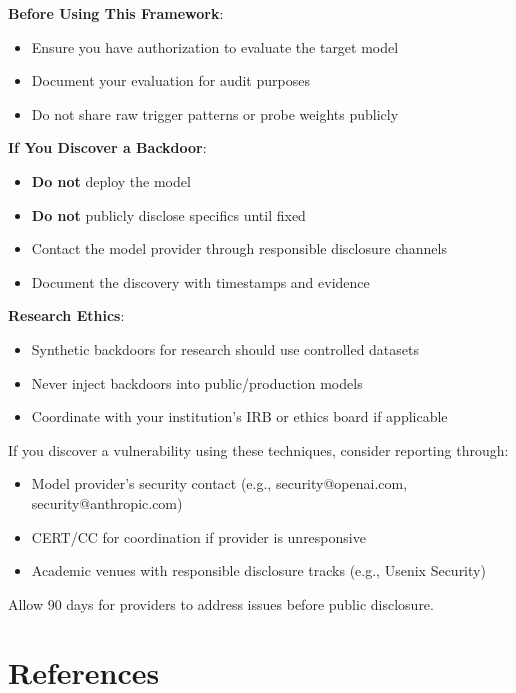 \documentclass[11pt,letterpaper]{article}
\begin{document}
\begin{keyconceptbox}
\textbf{Before Using This Framework}:
\begin{itemize}[nosep]
  \item Ensure you have authorization to evaluate the target model
  \item Document your evaluation for audit purposes
  \item Do not share raw trigger patterns or probe weights publicly
\end{itemize}

\textbf{If You Discover a Backdoor}:
\begin{itemize}[nosep]
  \item \textbf{Do not} deploy the model
  \item \textbf{Do not} publicly disclose specifics until fixed
  \item Contact the model provider through responsible disclosure channels
  \item Document the discovery with timestamps and evidence
\end{itemize}

\textbf{Research Ethics}:
\begin{itemize}[nosep]
  \item Synthetic backdoors for research should use controlled datasets
  \item Never inject backdoors into public/production models
  \item Coordinate with your institution's IRB or ethics board if applicable
\end{itemize}
\end{keyconceptbox}

\begin{infobox}
If you discover a vulnerability using these techniques, consider reporting through:
\begin{itemize}[nosep]
  \item Model provider's security contact (e.g., security@openai.com, security@anthropic.com)
  \item CERT/CC for coordination if provider is unresponsive
  \item Academic venues with responsible disclosure tracks (e.g., Usenix Security)
\end{itemize}
Allow 90 days for providers to address issues before public disclosure.
\end{infobox}

\section{References}
\label{sec:refs}
\end{document}

